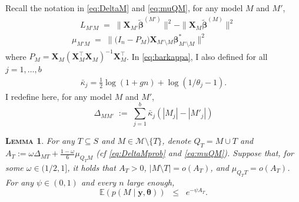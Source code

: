 \documentclass[
  12pt]{article}
\newcommand{\E}{\mathbb{E}}
\newcommand{\M}{\mathcal{M}}
\newcommand{\by}{\mathbf{y}}
\newcommand{\bbeta}{\boldsymbol{\beta}}
\newcommand{\btheta}{\boldsymbol{\theta}}
\newcommand{\bX}{\mathbf{X}}
\newtheorem{lem}[thm]{\textsc{Lemma}}
\begin{document}
Recall the notation in \eqref{eq:DeltaM} and \eqref{eq:muQM}, for any model $M$ and $M'$,
\begin{align*}
\quad L_{M'M}\;=\;\|\bX_{M'}\tilde{\bbeta}^{(M')}\|^2-\|\bX_{M}\tilde{\bbeta}^{(M)}\|^2\\
\mu_{M'M}\;=\;\|\big(I_n-P_M\big) \bX_{M'\setminus M} \bbeta^*_{M'\setminus M}\|^2
\end{align*}
where $P_M=\bX_{M}\left(\bX_{M}^{\top} \bX_{M}\right)^{-1} \bX_{M}^{\top}$.
In \eqref{eq:barkappa}, I also defined for all $j=1,\ldots,b$
\begin{align*}
\bar{\kappa}_j= \frac{1}{2} \log(1 + gn) + \log (1 / \theta_j - 1).
\end{align*}
I redefine here, for any model $M$ and $M'$,
\begin{equation}\label{eq:DeltaMprob}
\Delta_{MM'}\;:=\;\sum_{j=1}^b \bar{\kappa}_j(|M_j|-|M'_j|)
\end{equation}


\begin{lem}\label{lem:boundpostprob} For any $T\subseteq S$ and $M\in \M\setminus\{T\}$, denote $Q_T= M\cup T$ and $A_T:=\omega\Delta_{MT}+\tfrac{1-\omega}{6}\mu_{Q_TM}$ (\emph{cf} \eqref{eq:DeltaMprob} and \eqref{eq:muQM}). Suppose that, for some $\omega \in (1/2,1]$, it holds that $A_T>0$, $|M\setminus T|=o(A_T)$, and $\mu_{Q_T T}=o(A_T)$. For any $\psi\in(0,1)$ and every $n$ large enough,
$$\E\left(p(M\mid \by,\btheta)\right)  \;\;\leq\;\; e^{-\psi A_T}.$$
\end{lem}
\end{document}
